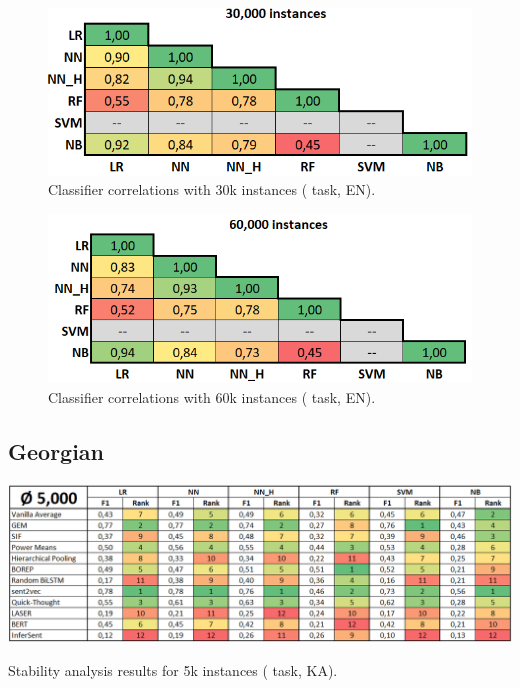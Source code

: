 \begin{figure}[H]
	\centering
	\includegraphics[scale=0.5]{images/corr_wc_en_30000}
	\caption[Classifier correlations with 30k instances ( task, EN)]
		{Classifier correlations with 30k instances ( task, EN).}
\end{figure}

\begin{figure}[H]
	\centering
	\includegraphics[scale=0.5]{images/corr_wc_en_60000}
	\caption[Classifier correlations with 60k instances ( task, EN)]
		{Classifier correlations with 60k instances ( task, EN).}
\end{figure}







\newpage

\subsection{Georgian}

\begin{table}[H]
	\centering
	\includegraphics[scale=0.55]{images/results_wc_ka_5000}
	\caption[Stability analysis results for 5k instances ( task, KA)]
		{Stability analysis results for 5k instances ( task, KA).}
\end{table}

